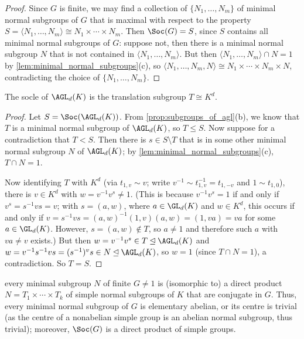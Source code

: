 \begin{proof}
    Since $G$ is finite, we may find a collection of $\{N_1,\dotsc,N_m\}$ of minimal normal subgroups of $G$ that is maximal with respect to the property $S = \langle N_1,\dotsc,N_m \rangle \cong N_1 \times \dotsb \times N_m$. Then $\Soc(G) = S$, since $S$ contains all minimal normal subgroups of $G$: suppose not, then there is a minimal normal subgroup $N$ that is not contained in $\langle N_1,\dotsc,N_m \rangle$. But then $\langle N_1,\dotsc,N_m \rangle \cap N = 1$ by \autoref{lem:minimal_normal_subgroups}(c), so $\langle N_1,\dotsc,N_m,N \rangle \cong N_1 \times \dotsb \times N_m \times N$, contradicting the choice of $\{N_1,\dotsc,N_m\}$.
\end{proof}

\begin{proposition}\label{prop:socle_agl}
    The socle of $\AGL_d(K)$ is the translation subgroup $T \cong K^d$.
\end{proposition}

\begin{proof}
    Let $S = \Soc(\AGL_d(K))$. From \autoref{prop:subgroups_of_agl}(b), we know that $T$ is a minimal normal subgroup of $\AGL_d(K)$, so $T \leq S$. Now suppose for a contradiction that $T < S$. Then there is $s \in S \setminus T$ that is in some other minimal normal subgroup $N$ of $\AGL_d(K)$; by \autoref{lem:minimal_normal_subgroups}(c), $T \cap N = 1$.

    Now identifying $T$ with $K^d$ (via $t_{1,v} \sim v$; write $v^{-1} \sim t_{1,v}^{-1} = t_{1,-v}$ and $1 \sim t_{1,0}$), there is $v \in K^d$ with $w = v^{-1}v^s \neq 1$. (This is because $v^{-1}v^s = 1$ if and only if $v^s = s^{-1}vs = v$; with $s = (a,w)$, where $a \in \GL_d(K)$ and $w \in K^d$, this occurs if and only if $v = s^{-1}vs = (a,w)^{-1}(1,v)(a,w) = (1,va) = va$ for some $a \in \GL_d(K)$. However, $s = (a,w) \not\in T$, so $a \neq 1$ and therefore such $a$ with $va \neq v$ exists.) But then $w = v^{-1}v^s \in T \unlhd \AGL_d(K)$ and $w = v^{-1}s^{-1}vs = (s^{-1})^vs \in N \unlhd \AGL_d(K)$, so $w = 1$ (since $T \cap N = 1$), a contradiction. So $T = S$.
\end{proof}

 every minimal subgroup $N$ of finite $G \neq 1$ is (isomorphic to) a direct product $N = T_1 \times \dotsb \times T_k$ of simple normal subgroups of $K$ that are conjugate in $G$. Thus, every minimal normal subgroup of $G$ is elementary abelian, or its centre is trivial (as the centre of a nonabelian simple group is an abelian normal subgroup, thus trivial); moreover, $\Soc(G)$ is a direct product of simple groups.

